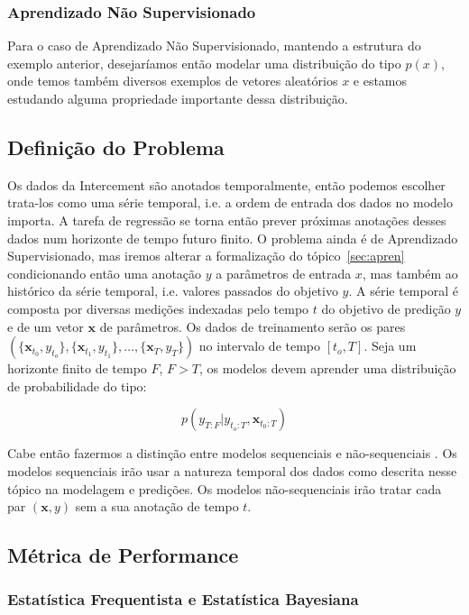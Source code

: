 \subsubsection{Aprendizado Não Supervisionado}

Para o caso de Aprendizado Não Supervisionado, mantendo a estrutura do exemplo
anterior, desejaríamos então modelar uma distribuição do tipo $p(x)$, onde temos
também diversos exemplos de vetores aleatórios $x$ e estamos estudando alguma propriedade importante dessa distribuição.


\subsection{Definição do Problema}


Os dados da Intercement são anotados temporalmente, então podemos escolher trata-los como uma série temporal, i.e. a ordem de entrada dos dados no modelo importa. A tarefa de regressão se torna então prever próximas anotações desses dados num horizonte de tempo futuro finito. O problema ainda é de Aprendizado Supervisionado, mas iremos alterar a formalização do tópico~\ref{sec:apren} condicionando então uma anotação $y$ a parâmetros de entrada $x$, mas também ao histórico da série temporal, i.e. valores passados do objetivo $y$. A série temporal é composta por diversas medições indexadas pelo tempo $t$ do objetivo de predição $y$ e de um vetor $\textbf{x}$ de parâmetros. Os dados de treinamento serão os pares $(\{\textbf{x}_{t_0},y_{t_o}\},\{\textbf{x}_{t_1},y_{t_1}\}, \dots, \{\textbf{x}_{T},y_{T}\})$ no intervalo de tempo $[t_o,T]$. Seja um horizonte finito de tempo $F$, $F > T$, os modelos devem aprender uma distribuição de probabilidade do tipo:

\[ p(y_{T:F} | y_{t_{o}:T},\textbf{x}_{t_{0}:T}) \]

Cabe então fazermos a distinção entre modelos sequenciais e não-sequenciais \cite{dlbook}. Os modelos sequenciais irão usar a natureza temporal dos dados como descrita nesse tópico na modelagem e predições. Os modelos não-sequenciais irão tratar cada par $(\textbf{x},y)$ sem a sua anotação de tempo $t$.


\subsection{Métrica de Performance}
\label{sec:metricas}
\subsubsection{Estatística Frequentista e Estatística Bayesiana}
 
